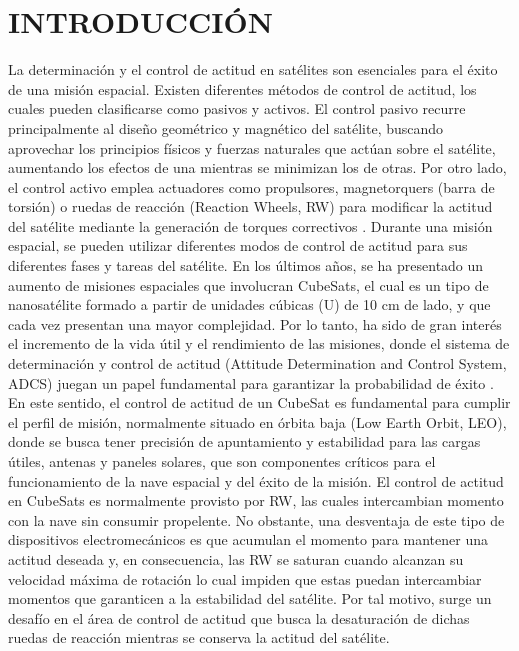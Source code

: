 \section{INTRODUCCIÓN}

La determinación y el control de actitud en satélites son esenciales para el éxito de una misión espacial. Existen diferentes métodos de control de actitud, los cuales pueden clasificarse como pasivos y activos. El control pasivo recurre principalmente al diseño geométrico y magnético del satélite, buscando aprovechar los principios físicos y fuerzas naturales que actúan sobre el satélite, aumentando los efectos de una mientras se minimizan los de otras. Por otro lado, el control activo emplea actuadores como propulsores, magnetorquers (barra de torsión) o ruedas de reacción (Reaction Wheels, RW)  para modificar la actitud del satélite mediante la generación de torques correctivos \cite{Wertz1999}. Durante una misión espacial, se pueden utilizar diferentes modos de control de actitud para sus diferentes fases y tareas del satélite.
En los últimos años, se ha presentado un aumento de misiones espaciales que involucran CubeSats, el cual es un tipo de nanosatélite formado a partir de unidades cúbicas (U) de 10 cm de lado, y que cada vez presentan una mayor complejidad. Por lo tanto, ha sido de gran interés el incremento de la vida útil y el rendimiento de las misiones, donde el sistema de determinación y control de actitud (Attitude Determination and Control System, ADCS)  juegan un papel fundamental para garantizar la probabilidad de éxito \cite{Venturini2018}. En este sentido, el control de actitud de un CubeSat es fundamental para cumplir el perfil de misión, normalmente situado en órbita baja (Low Earth Orbit, LEO),  donde se busca tener precisión de apuntamiento y estabilidad para las cargas útiles, antenas y paneles solares, que son componentes críticos para el funcionamiento de la nave espacial y del éxito de la misión.
El control de actitud en CubeSats es normalmente provisto por RW, las cuales intercambian momento con la nave sin consumir propelente. No obstante, una desventaja de este tipo de dispositivos electromecánicos es que acumulan el momento para mantener una actitud deseada y, en consecuencia, las RW se saturan cuando alcanzan su velocidad máxima de rotación lo cual impiden que estas puedan intercambiar momentos que garanticen a la estabilidad del satélite. Por tal motivo, surge un desafío en el área de control de actitud que busca la desaturación de dichas ruedas de reacción mientras se conserva la actitud del satélite.
